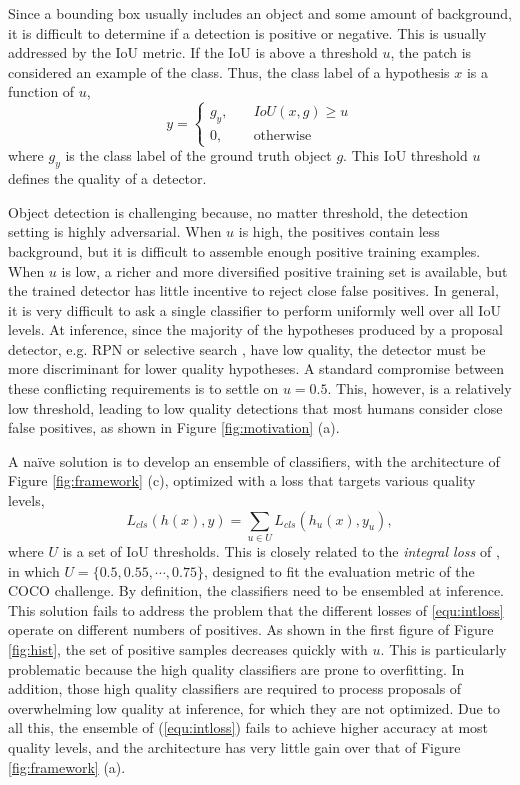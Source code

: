 \documentclass[10pt,twocolumn,letterpaper]{article}
\begin{document}
Since a bounding box usually includes an object and some amount of background, it is difficult to determine if a detection is positive or negative. This is usually addressed by the IoU metric. If the IoU is above a threshold $u$, the patch is considered an example of the class. Thus, the class label of a hypothesis $x$ is a function of $u$,
\begin{equation}
\label{equ:cls label}
y=\left\{
\begin{array}{cl}g_y, &\quad\textrm{$IoU(x,g)\geq{u}$}\\
0, &\quad\textrm{otherwise} \end{array}\right.
\end{equation}
where $g_y$ is the class label of the ground truth object $g$. This IoU threshold $u$ defines the quality of a detector.

Object detection is challenging because, no matter threshold, the detection
setting is highly adversarial. When $u$ is high, the positives contain
less background, but it is difficult to assemble enough positive training
examples. When $u$ is low, a richer and more diversified positive training
set is available, but the trained detector has little incentive to reject
close false positives. In general, it is very difficult to ask a single
classifier to perform uniformly well over all IoU levels. At inference,
since the majority of the hypotheses produced by a proposal detector,
e.g. RPN \cite{DBLP:conf/nips/RenHGS15} or selective
search \cite{DBLP:journals/ijcv/UijlingsSGS13}, have low quality, the detector
must be more discriminant for lower quality hypotheses. A standard
compromise between these conflicting requirements is to settle on $u=0.5$.
This, however, is a relatively low threshold, leading to low quality
detections that most humans consider close false positives, as shown in
Figure \ref{fig:motivation} (a).

A na\"ive solution is to develop an ensemble of classifiers, with the
architecture of Figure \ref{fig:framework} (c), optimized with
a loss that targets various quality levels,
\begin{equation}
  \label{equ:intloss}
  L_{cls}(h(x),y)=\sum_{u\in{U}}L_{cls}(h_u(x),y_u),
\end{equation}
where $U$ is a set of IoU thresholds. This is closely related
to the \textit{integral loss} of \cite{DBLP:conf/bmvc/ZagoruykoLLPGCD16}, in
which $U=\{0.5,0.55,\cdots,0.75\}$, designed to fit the evaluation
metric of the COCO challenge. By definition, the classifiers need to be
ensembled at inference. This solution fails to address the problem that
the different losses of \eqref{equ:intloss} operate on different numbers of
positives. As shown in the first figure of Figure \ref{fig:hist}, the set of
positive samples decreases quickly with $u$. This is particularly
problematic because the high quality classifiers are prone to overfitting.
In addition, those high quality classifiers are required to process
proposals of overwhelming low quality at inference, for which they are not
optimized. Due to all this, the ensemble of (\ref{equ:intloss})
fails to achieve higher accuracy at most quality levels, and the architecture
has very little gain over that of Figure \ref{fig:framework} (a).
\end{document}
